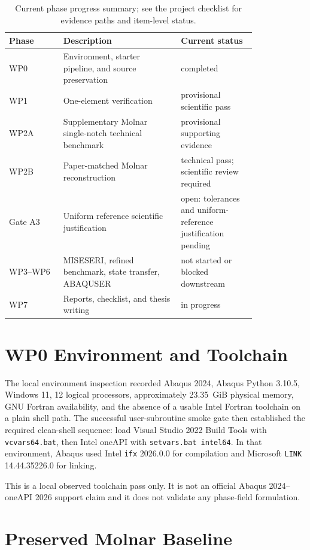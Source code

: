 \documentclass[11pt,a4paper]{article}
\begin{document}
\begin{table}[H]
\centering
\caption{Current phase progress summary; see the project checklist for evidence paths and item-level status.}
\begin{tabular}{p{0.18\linewidth} p{0.39\linewidth} p{0.25\linewidth}}
\toprule
Phase & Description & Current status \\
\midrule
WP0 & Environment, starter pipeline, and source preservation & completed \\
WP1 & One-element verification & provisional scientific pass \\
WP2A & Supplementary Molnar single-notch technical benchmark & provisional supporting evidence \\
WP2B & Paper-matched Molnar reconstruction & technical pass; scientific review required \\
Gate A3 & Uniform reference scientific justification & open: tolerances and uniform-reference justification pending \\
WP3--WP6 & MISESERI, refined benchmark, state transfer, ABAQUSER & not started or blocked downstream \\
WP7 & Reports, checklist, and thesis writing & in progress \\
\bottomrule
\end{tabular}
\end{table}

\section{WP0 Environment and Toolchain}

The local environment inspection recorded Abaqus 2024, Abaqus Python 3.10.5, Windows 11, 12 logical processors, approximately \SI{23.35}{GiB} physical memory, GNU Fortran availability, and the absence of a usable Intel Fortran toolchain on a plain shell path. The successful user-subroutine smoke gate then established the required clean-shell sequence: load Visual Studio 2022 Build Tools with \texttt{vcvars64.bat}, then Intel oneAPI with \texttt{setvars.bat intel64}. In that environment, Abaqus used Intel \texttt{ifx} 2026.0.0 for compilation and Microsoft \texttt{LINK} 14.44.35226.0 for linking.

This is a local observed toolchain pass only. It is not an official Abaqus 2024--oneAPI 2026 support claim and it does not validate any phase-field formulation.

\section{Preserved Molnar Baseline}
\end{document}
